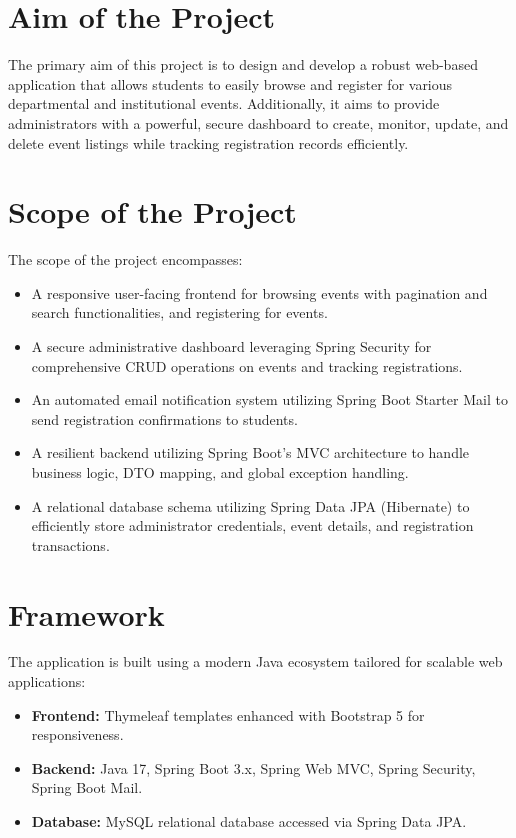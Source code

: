 \documentclass[12pt]{report}
\begin{document}
\section{Aim of the Project} 
The primary aim of this project is to design and develop a robust web-based application that allows students to easily browse and register for various departmental and institutional events. Additionally, it aims to provide administrators with a powerful, secure dashboard to create, monitor, update, and delete event listings while tracking registration records efficiently.

\section{Scope of the Project} 
The scope of the project encompasses:
\begin{itemize}
    \item A responsive user-facing frontend for browsing events with pagination and search functionalities, and registering for events.
    \item A secure administrative dashboard leveraging Spring Security for comprehensive CRUD operations on events and tracking registrations.
    \item An automated email notification system utilizing Spring Boot Starter Mail to send registration confirmations to students.
    \item A resilient backend utilizing Spring Boot's MVC architecture to handle business logic, DTO mapping, and global exception handling.
    \item A relational database schema utilizing Spring Data JPA (Hibernate) to efficiently store administrator credentials, event details, and registration transactions.
\end{itemize}

\section{Framework} 
The application is built using a modern Java ecosystem tailored for scalable web applications:
\begin{itemize}
    \item \textbf{Frontend:} Thymeleaf templates enhanced with Bootstrap 5 for responsiveness.
    \item \textbf{Backend:} Java 17, Spring Boot 3.x, Spring Web MVC, Spring Security, Spring Boot Mail.
    \item \textbf{Database:} MySQL relational database accessed via Spring Data JPA.
\end{itemize}
\end{document}
